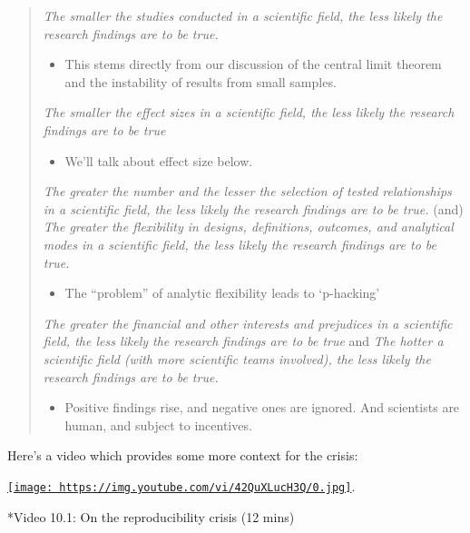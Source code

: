 \documentclass[
]{article}
\providecommand{\tightlist}{%
  \setlength{\itemsep}{0pt}\setlength{\parskip}{0pt}}
\begin{document}
\begin{quote}
\emph{The smaller the studies conducted in a scientific field, the less
likely the research findings are to be true.}

\begin{itemize}
\tightlist
\item
  This stems directly from our discussion of the central limit theorem
  and the instability of results from small samples.
\end{itemize}

\emph{The smaller the effect sizes in a scientific field, the less
likely the research findings are to be true}

\begin{itemize}
\tightlist
\item
  We'll talk about effect size below.
\end{itemize}

\emph{The greater the number and the lesser the selection of tested
relationships in a scientific field, the less likely the research
findings are to be true.} (and) \emph{The greater the flexibility in
designs, definitions, outcomes, and analytical modes in a scientific
field, the less likely the research findings are to be true.}

\begin{itemize}
\tightlist
\item
  The ``problem'' of analytic flexibility leads to `p-hacking'
\end{itemize}

\emph{The greater the financial and other interests and prejudices in a
scientific field, the less likely the research findings are to be true}
and \emph{The hotter a scientific field (with more scientific teams
involved), the less likely the research findings are to be true.}

\begin{itemize}
\tightlist
\item
  Positive findings rise, and negative ones are ignored. And scientists
  are human, and subject to incentives.
\end{itemize}
\end{quote}

Here's a video which provides some more context for the crisis:

\href{https://youtu.be/42QuXLucH3Q}{\texttt{[image: https://img.youtube.com/vi/42QuXLucH3Q/0.jpg]}}.

*Video 10.1: On the reproducibility crisis (12 mins)
\end{document}
